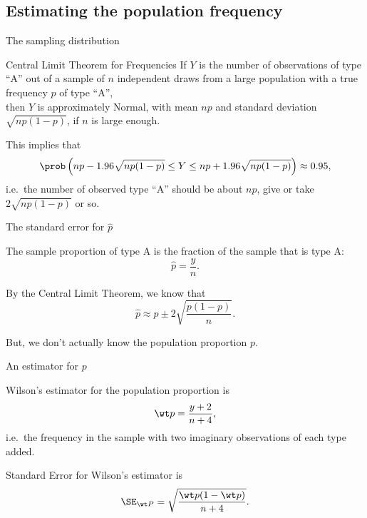 \subsection{Estimating the population frequency}

\begin{frame}{The sampling distribution}

    \begin{block}{Central Limit Theorem for Frequencies}
        If $Y$ is the number of observations of type ``A''
        out of a sample of $n$ independent draws
        from a large population with a true frequency $p$ of type ``A'', \\
        then $Y$ is \alert{approximately Normal},
        with mean $np$ and standard deviation $\sqrt{n p (1-p)}$,
        if $n$ is large enough.
    \end{block}

    \vspace{2em}

    This implies that 
    \[ \prob\left( np - 1.96 \sqrt{n p(1-p)} \le Y \le np + 1.96 \sqrt{n p (1-p)} \right) \approx 0.95 , \]
    i.e.\ the number of observed type ``A'' should be about $np$, give or take $2 \sqrt{n p (1-p)}$ or so.

    \vspace{2em}


\end{frame}

\begin{frame}{The standard error for $\hat p$}

    The \alert{sample proportion} of type A is
    the fraction of the sample that is type A:
    \[ \hat p = \frac{y}{n} . \]

    \vspace{2em}

    By the Central Limit Theorem, we know that 
    \[  \hat p \approx p \pm 2 \sqrt{ \frac{ p(1-p) }{ n } } .\]

    \vspace{2em}

    But, we don't actually know the population proportion $p$.

\end{frame}

\begin{frame}{An estimator for $p$}

    \begin{block}{Wilson's estimator}
        for the population proportion is
        \[ \wt p = \frac{ y+2 }{ n+4 } ,\]
        i.e.\ the frequency in the sample with two imaginary observations of each type added.
    \end{block}

    \vspace{2em}


    \begin{block}{Standard Error}
        for Wilson's estimator is
        \[ \SE_{\wt P} = \sqrt{\frac{\wt p (1-\wt p)}{n+4} } .\]
    \end{block}


\end{frame}

